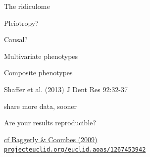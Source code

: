 \documentclass[12pt,t]{beamer}
\begin{document}
\begin{frame}[c]{The ridiculome}
\end{frame}


\begin{frame}[c]{Pleiotropy?}
\end{frame}

\begin{frame}[c]{Causal?}
\end{frame}



\begin{frame}[c]{Multivariate phenotypes}
\end{frame}



\begin{frame}{Composite phenotypes}

\vspace{7mm}


\vspace{7mm}

\hfill {\scriptsize \color{lolit} Shaffer et al. (2013) J Dent Res 92:32-37}

\end{frame}



\begin{frame}[c]{}
  \centerline{\Large share more data, sooner}
\end{frame}



\begin{frame}[c]{}

  \vspace{35mm}

  \centerline{\Large Are your results reproducible?}

  \vspace{35mm}
  \hfill
  \href{https://projecteuclid.org/euclid.aoas/1267453942}
       {\scriptsize \lolit cf Baggerly \& Coombes (2009) \\
         \hfill \tt projecteuclid.org/euclid.aoas/1267453942}

\end{frame}
\end{document}
